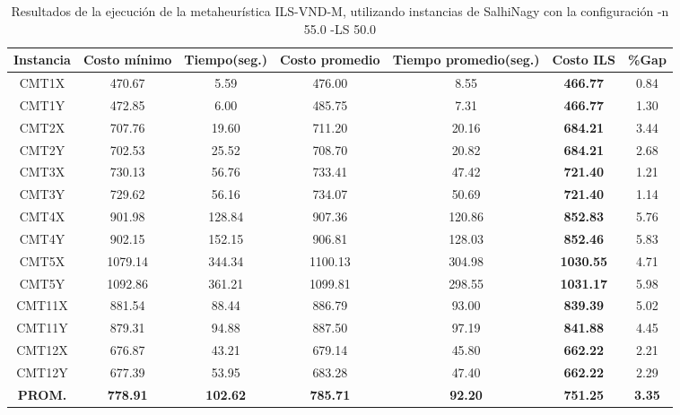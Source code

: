 \begin{table}[h]
\caption{Resultados de la ejecución de la metaheurística ILS-VND-M, utilizando instancias de SalhiNagy con la configuración -n 55.0 -LS 50.0}
\centering
\small
\begin{tabular}{c c c c c c c}
\hline\hline
Instancia & Costo mínimo & Tiempo(seg.) & Costo promedio & Tiempo promedio(seg.) & Costo ILS & \%Gap \\ [0.5ex]
\hline
CMT1X & 470.67 & 5.59 & 
476.00 & 8.55 & \bf{466.77} & 
0.84\\CMT1Y & 472.85 & 6.00 & 
485.75 & 7.31 & \bf{466.77} & 
1.30\\CMT2X & 707.76 & 19.60 & 
711.20 & 20.16 & \bf{684.21} & 
3.44\\CMT2Y & 702.53 & 25.52 & 
708.70 & 20.82 & \bf{684.21} & 
2.68\\CMT3X & 730.13 & 56.76 & 
733.41 & 47.42 & \bf{721.40} & 
1.21\\CMT3Y & 729.62 & 56.16 & 
734.07 & 50.69 & \bf{721.40} & 
1.14\\CMT4X & 901.98 & 128.84 & 
907.36 & 120.86 & \bf{852.83} & 
5.76\\CMT4Y & 902.15 & 152.15 & 
906.81 & 128.03 & \bf{852.46} & 
5.83\\CMT5X & 1079.14 & 344.34 & 
1100.13 & 304.98 & \bf{1030.55} & 
4.71\\CMT5Y & 1092.86 & 361.21 & 
1099.81 & 298.55 & \bf{1031.17} & 
5.98\\CMT11X & 881.54 & 88.44 & 
886.79 & 93.00 & \bf{839.39} & 
5.02\\CMT11Y & 879.31 & 94.88 & 
887.50 & 97.19 & \bf{841.88} & 
4.45\\CMT12X & 676.87 & 43.21 & 
679.14 & 45.80 & \bf{662.22} & 
2.21\\CMT12Y & 677.39 & 53.95 & 
683.28 & 47.40 & \bf{662.22} & 
2.29\\\bf{PROM.} & 
\bf{778.91} & \bf{102.62} & \bf{785.71} & \bf{92.20} & \bf{751.25} & \bf{3.35}\\[1ex]\hline
\end{tabular}
\label{table:ILS-VND-M-55-50-S}
\end{table}

